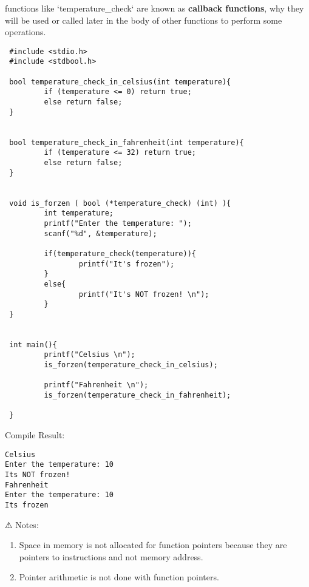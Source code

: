 functions like `temperature\_check` are known as \textbf{callback functions}, why they will be used or called later in the 
body of other functions to perform some operations.


\begin{lstlisting} 
 #include <stdio.h>
 #include <stdbool.h>

 bool temperature_check_in_celsius(int temperature){
         if (temperature <= 0) return true;
         else return false;
 }


 bool temperature_check_in_fahrenheit(int temperature){
         if (temperature <= 32) return true;
         else return false;
 }


 void is_forzen ( bool (*temperature_check) (int) ){
         int temperature;
         printf("Enter the temperature: ");
         scanf("%d", &temperature);

         if(temperature_check(temperature)){
                 printf("It's frozen");
         }
         else{
                 printf("It's NOT frozen! \n");
         }
 }


 int main(){
         printf("Celsius \n");
         is_forzen(temperature_check_in_celsius);

         printf("Fahrenheit \n");
         is_forzen(temperature_check_in_fahrenheit);

 }
\end{lstlisting}


Compile Result:
\begin{lstlisting} 
Celsius
Enter the temperature: 10
Its NOT frozen!
Fahrenheit
Enter the temperature: 10
Its frozen
\end{lstlisting}

⚠  Notes:
\begin{enumerate}
        \item Space in memory is not allocated for function pointers because they are pointers to instructions and not memory address.
        \item Pointer arithmetic is not done with function pointers.
\end{enumerate}

